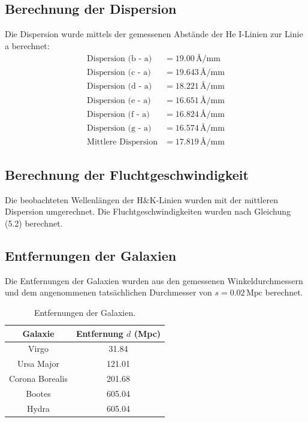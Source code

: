 \documentclass[a4paper,12pt]{article}
\begin{document}
\subsection*{Berechnung der Dispersion}
Die Dispersion wurde mittels der gemessenen Abstände der He I-Linien zur Linie a berechnet:
\begin{align*}
\text{Dispersion (b - a)} &= 19.00 \, \text{Å/mm} \\
\text{Dispersion (c - a)} &= 19.643 \, \text{Å/mm} \\
\text{Dispersion (d - a)} &= 18.221 \, \text{Å/mm} \\
\text{Dispersion (e - a)} &= 16.651 \, \text{Å/mm} \\
\text{Dispersion (f - a)} &= 16.824 \, \text{Å/mm} \\
\text{Dispersion (g - a)} &= 16.574 \, \text{Å/mm} \\
\text{Mittlere Dispersion} &= 17.819 \, \text{Å/mm}
\end{align*}

\subsection*{Berechnung der Fluchtgeschwindigkeit}
Die beobachteten Wellenlängen der H\&K-Linien wurden mit der mittleren Dispersion umgerechnet. Die Fluchtgeschwindigkeiten wurden nach Gleichung (5.2) berechnet.

\subsection*{Entfernungen der Galaxien}
Die Entfernungen der Galaxien wurden aus den gemessenen Winkeldurchmessern und dem angenommenen tatsächlichen Durchmesser von $s = 0.02 \, \text{Mpc}$ berechnet.

\begin{table}[H]
    \centering
    \begin{tabular}{cc}
        \toprule
        Galaxie & Entfernung $d$ (Mpc) \\
        \midrule
        Virgo & 31.84 \\
        Ursa Major & 121.01 \\
        Corona Borealis & 201.68 \\
        Bootes & 605.04 \\
        Hydra & 605.04 \\
        \bottomrule
    \end{tabular}
    \caption{Entfernungen der Galaxien.}
    \label{tab:entfernungen}
\end{table}
\end{document}
